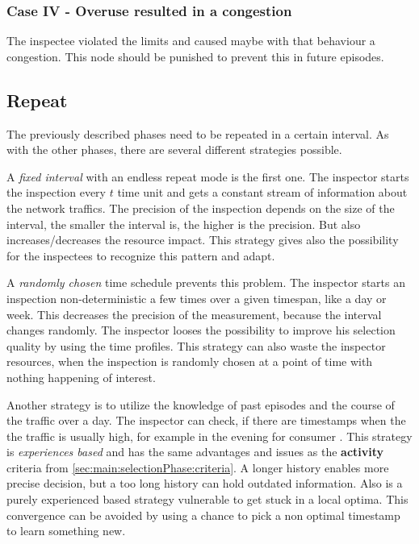 \documentclass[thesis.tex]{subfiles}
\begin{document}
\subsubsection{Case IV - Overuse resulted in a congestion}
The inspectee violated the limits and caused maybe with that behaviour a congestion. This node should be punished to prevent this in future episodes.

\subsection{Repeat} \label{sec:main:repeatphase}

The previously described phases need to be repeated in a certain interval. As with the other phases, there are several different strategies possible.

A \textit{fixed interval} with an endless repeat mode is the first one. The inspector starts the inspection every $t$ time unit and gets a constant stream of information about the network traffics. The precision of the inspection depends on the size of the interval, the smaller the interval is, the higher is the precision. But also increases/decreases the resource impact. This strategy gives also the possibility for the inspectees to recognize this pattern and adapt.

A \textit{randomly chosen} time schedule prevents this problem. The inspector starts an inspection non-deterministic a few times over a given timespan, like a day or week. This decreases the precision of the measurement, because the interval changes randomly. The inspector looses the possibility to improve his selection quality by using the time profiles. This strategy can also waste the inspector resources, when the inspection is randomly chosen at a point of time with nothing happening of interest.

Another strategy is to utilize the knowledge of past episodes and the course of the traffic over a day. The inspector can check, if there are timestamps when the the traffic is usually high, for example in the evening for consumer . This strategy is \textit{experiences based} and has the same advantages and issues as the \textbf{activity} criteria from \autoref{sec:main:selectionPhase:criteria}. A longer history enables more precise decision, but a too long history can hold outdated information. Also is a purely experienced based strategy vulnerable to get stuck in a local optima. This convergence can be avoided by using a chance to pick a non optimal timestamp to learn something new.
\end{document}
